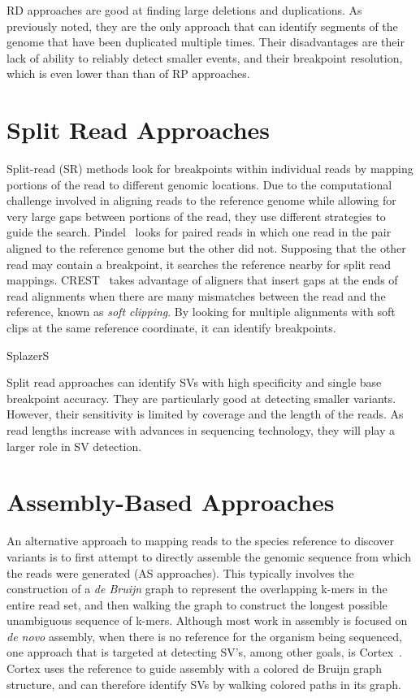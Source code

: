 RD approaches are good at finding large deletions and duplications. As previously noted, they are the only approach that can identify segments of the genome that have been duplicated multiple times. Their disadvantages are their lack of ability to reliably detect smaller events, and their breakpoint resolution, which is even lower than than of RP approaches.

\section{Split Read Approaches}

Split-read (SR) methods look for breakpoints within individual reads by mapping portions of the read to different genomic locations. Due to the computational challenge involved in aligning reads to the reference genome while allowing for very large gaps between portions of the read, they use different strategies to guide the search. Pindel~\cite{Ye:2009p2} looks for paired reads in which one read in the pair aligned to the reference genome but the other did not. Supposing that the other read may contain a breakpoint, it searches the reference nearby for split read mappings. CREST~\cite{Wang:2011p1607} takes advantage of aligners that insert gaps at the ends of read alignments when there are many mismatches between the read and the reference, known as \emph{soft clipping}. By looking for multiple alignments with soft clips at the same reference coordinate, it can identify breakpoints. 

SplazerS

Split read approaches can identify SVs with high specificity and single base breakpoint accuracy. They are particularly good at detecting smaller variants. However, their sensitivity is limited by coverage and the length of the reads. As read lengths increase with advances in sequencing technology, they will play a larger role in SV detection.

\section{Assembly-Based Approaches}

An alternative approach to mapping reads to the species reference to discover variants is to first attempt to directly assemble the genomic sequence from which the reads were generated (AS approaches). This typically involves the construction of a \emph{de Bruijn} graph to represent the overlapping k-mers in the entire read set, and then walking the graph to construct the longest possible unambiguous sequence of k-mers. Although most work in assembly is focused on \emph{de novo} assembly, when there is no reference for the organism being sequenced, one approach that is targeted at detecting SV's, among other goals, is Cortex~\cite{Iqbal:2012p1837}. Cortex uses the reference to guide assembly with a colored de Bruijn graph structure, and can therefore identify SVs by walking colored paths in its graph.


